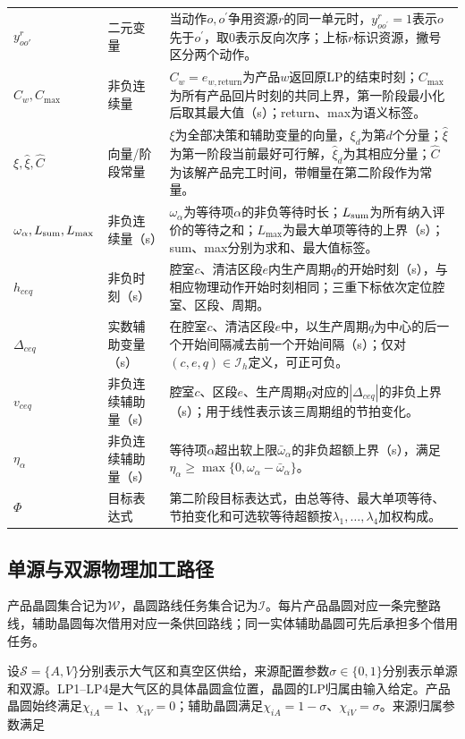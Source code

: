 \documentclass[final,5p,times,twocolumn]{elsarticle}
\begin{document}
\begin{table}[t]
\begin{tabular}{C{0.23\textwidth}C{0.10\textwidth}C{0.61\textwidth}}
$y^r_{oo'}$ & 二元变量 & 当动作$o,o^{\prime}$争用资源$r$的同一单元时，$y^r_{oo^{\prime}}=1$表示$o$先于$o^{\prime}$，取0表示反向次序；上标$r$标识资源，撇号区分两个动作。\\
$C_w,C_{\max}$ & 非负连续量 & $C_w=e_{w,\mathrm{return}}$为产品$w$返回原LP的结束时刻；$C_{\max}$为所有产品回片时刻的共同上界，第一阶段最小化后取其最大值（s）；return、max为语义标签。\\
$\xi,\widehat\xi,\widehat C$ & 向量/阶段常量 & $\xi$为全部决策和辅助变量的向量，$\xi_d$为第$d$个分量；$\widehat\xi$为第一阶段当前最好可行解，$\widehat\xi_d$为其相应分量；$\widehat C$为该解产品完工时间，带帽量在第二阶段作为常量。\\
$\omega_\alpha,L_{\rm sum},L_{\max}$ & 非负连续量（s） & $\omega_\alpha$为等待项$\alpha$的非负等待时长；$L_{\rm sum}$为所有纳入评价的等待之和；$L_{\max}$为最大单项等待的上界（s）；sum、max分别为求和、最大值标签。\\
$h_{ceq}$ & 非负时刻（s） & 腔室$c$、清洁区段$e$内生产周期$q$的开始时刻（s），与相应物理动作开始时刻相同；三重下标依次定位腔室、区段、周期。\\
$\Delta_{ceq}$ & 实数辅助变量（s） & 在腔室$c$、清洁区段$e$中，以生产周期$q$为中心的后一个开始间隔减去前一个开始间隔（s）；仅对$(c,e,q)\in\mathcal I_h$定义，可正可负。\\
$v_{ceq}$ & 非负连续辅助量（s） & 腔室$c$、区段$e$、生产周期$q$对应的$|\Delta_{ceq}|$的非负上界（s）；用于线性表示该三周期组的节拍变化。\\
$\eta_\alpha$ & 非负连续辅助量（s） & 等待项$\alpha$超出软上限$\bar\omega_\alpha$的非负超额上界（s），满足$\eta_\alpha\ge\max\{0,\omega_\alpha-\bar\omega_\alpha\}$。\\
$\Phi$ & 目标表达式 & 第二阶段目标表达式，由总等待、最大单项等待、节拍变化和可选软等待超额按$\lambda_1,\ldots,\lambda_4$加权构成。\\
\bottomrule
\end{tabular}
\end{table}

\subsection{单源与双源物理加工路径}
\label{sec:model-path-cn}

产品晶圆集合记为$\mathcal W$，晶圆路线任务集合记为$\mathcal I$。每片产品晶圆对应一条完整路线，辅助晶圆每次借用对应一条供回路线；同一实体辅助晶圆可先后承担多个借用任务。

设$\mathcal S=\{A,V\}$分别表示大气区和真空区供给，来源配置参数$\sigma\in\{0,1\}$分别表示单源和双源。LP1--LP4是大气区的具体晶圆盒位置，晶圆的LP归属由输入给定。产品晶圆始终满足$\chi_{iA}=1$、$\chi_{iV}=0$；辅助晶圆满足$\chi_{iA}=1-\sigma$、$\chi_{iV}=\sigma$。来源归属参数满足
\end{document}
